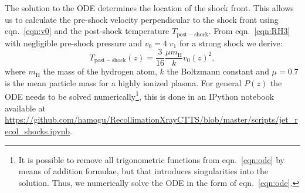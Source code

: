 The solution to the ODE determines the location of the shock front. This allows us to calculate the pre-shock velocity perpendicular to the shock front using eqn.~\ref{eqn:v0} and the post-shock temperature $T_{\mathrm{post-shock}}$. From eqn.~\ref{eqn:RH3} with negligible pre-shock pressure and $v_0=4\;v_1$ for a strong shock we derive:
\begin{equation}
T_{\mathrm{post-shock}}(z) = \frac{3}{16} \frac{\mu m_{\textrm{H}}}{k} v_0(z)^2,\label{eqn:T}
\end{equation}
where $m_{\textrm{H}}$ the mass of the hydrogen atom, $k$ the Boltzmann constant and $\mu=0.7$ is the mean particle mass for a highly ionized plasma. For general $P(z)$ the ODE needs to be solved numerically\footnote{It is possible to remove all trigonometric functions from eqn.~\ref{eqn:ode} by means of addition formulae, but that introduces singularities into the solution. Thus, we numerically solve the ODE in the form of eqn.~\ref{eqn:ode}.}, this is done in an IPython notebook available at \url{https://github.com/hamogu/RecollimationXrayCTTS/blob/master/scripts/jet_recol_shocks.ipynb}.

